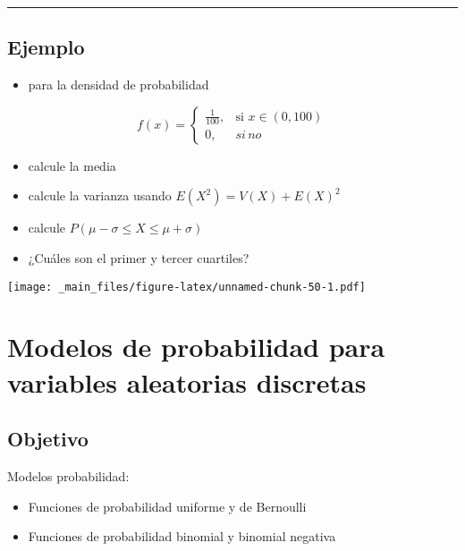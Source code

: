 \documentclass[
]{book}
\providecommand{\tightlist}{%
  \setlength{\itemsep}{0pt}\setlength{\parskip}{0pt}}
\begin{document}
\begin{center}\rule{0.5\linewidth}{0.5pt}\end{center}

\hypertarget{ejemplo-8}{%
\section{Ejemplo}\label{ejemplo-8}}

\begin{itemize}
\tightlist
\item
  para la densidad de probabilidad
\end{itemize}

\[
    f(x)= 
\begin{cases}
    \frac{1}{100},& \text{si } x\in (0,100)\\
    0,& si \, no 
\end{cases}
\]

\begin{itemize}
\tightlist
\item
  calcule la media
\item
  calcule la varianza usando \(E(X^2)=V(X)+E(X)^2\)
\item
  calcule \(P(\mu-\sigma\leq X \leq \mu+\sigma)\)
\item
  ¿Cuáles son el primer y tercer cuartiles?
\end{itemize}

\texttt{[image: \_main\_files/figure-latex/unnamed-chunk-50-1.pdf]}

\hypertarget{modelos-de-probabilidad-para-variables-aleatorias-discretas}{%
\chapter{Modelos de probabilidad para variables aleatorias discretas}\label{modelos-de-probabilidad-para-variables-aleatorias-discretas}}

\hypertarget{objetivo-6}{%
\section{Objetivo}\label{objetivo-6}}

Modelos probabilidad:

\begin{itemize}
\tightlist
\item
  Funciones de probabilidad uniforme y de Bernoulli
\item
  Funciones de probabilidad binomial y binomial negativa
\end{itemize}
\end{document}
